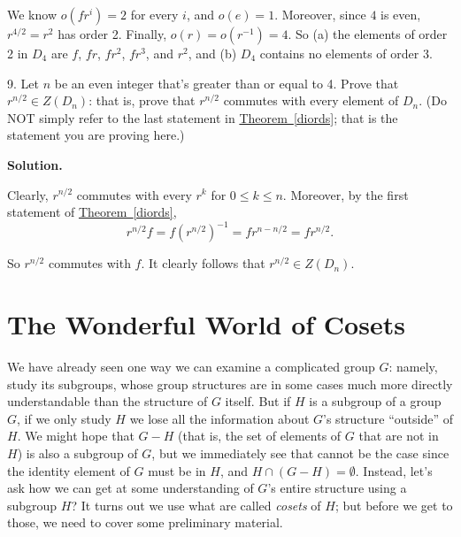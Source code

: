 \documentclass[10pt,]{book}
\theoremstyle{plain}
\theoremstyle{definition}
\theoremstyle{definition}
\theoremstyle{definition}
\theoremstyle{definition}
\numberwithin{equation}{section}
\begin{document}
\begin{exerciselist}
      We know \(o(fr^i)=2\) for every \(i\), and \(o(e)=1\). Moreover, since \(4\) is even, \(r^{4/2}=r^2\) has order 2. Finally, \(o(r)=o(r^{-1})=4\). So (a) the elements of order 2 in \(D_4\) are \(f\), \(fr\), \(fr^2\), \(fr^3\), and \(r^2\), and (b) \(D_4\) contains no elements of order 3.
\item[9.]\hypertarget{exercise-49}{}
        Let \(n\) be an even integer that's greater than or equal to 4. Prove that \(r^{n/2}\in Z(D_n)\): that is, prove that \(r^{n/2}\) commutes with every element of \(D_n\). (Do NOT simply refer to the last statement in \hyperref[diords]{Theorem~\ref{diords}}; that is the statement you are proving here.)
\par\smallskip
\par\smallskip
\noindent\textbf{Solution.}\hypertarget{solution-49}{}\quad

      Clearly, \(r^{n/2}\) commutes with every \(r^k\) for \(0\leq k\leq n\). Moreover, by the first statement of \hyperref[diords]{Theorem~\ref{diords}},
\begin{equation*}

        r^{n/2}f=f(r^{n/2})^{-1}=fr^{n-n/2}=fr^{n/2}.
      
\end{equation*}

\par

      So \(r^{n/2}\) commutes with \(f\). It clearly follows that \(r^{n/2}\in Z(D_n)\).
\end{exerciselist}
\typeout{************************************************}
\typeout{************************************************}
\chapter[{The Wonderful World of Cosets}]{The Wonderful World of Cosets}\label{coslag}
\typeout{************************************************}
\typeout{************************************************}

      We have already seen one way we can examine a complicated group \(G\):
      namely, study its subgroups, whose group structures are in some
      cases much more directly understandable than the structure of \(G\)
      itself. But if \(H\) is a subgroup of a group \(G\), if we only study
      \(H\) we lose all the information about \(G\)'s structure ``outside'' of
      \(H\). We might hope that \(G-H\) (that is, the set of elements of \(G\)
      that are not in \(H\)) is also a subgroup of \(G\), but we immediately
      see that cannot be the case since the identity element of \(G\) must
      be in \(H\), and \(H\cap (G-H)=\emptyset\). Instead, let's ask how we
      can get at some understanding of \(G\)'s entire structure using a
      subgroup \(H\)? It turns out we use what are called \emph{cosets} of
      \(H\); but before we get to those, we need to cover some preliminary
      material.
\typeout{************************************************}
\typeout{************************************************}
\end{document}
